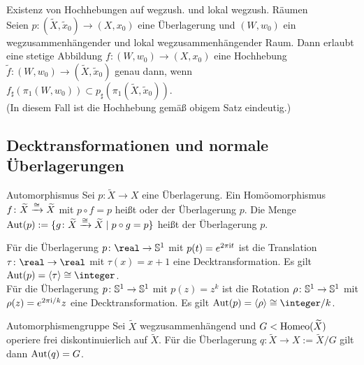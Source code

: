 \begin{Satz}{Existenz von Hochhebungen auf wegzush.
             und lokal wegzush. Räumen}\\
    Seien $p\colon (\widetilde{X}, \widetilde{x}_0) \rightarrow (X, x_0)$
    eine Überlagerung und $(W, w_0)$ ein wegzusammenhängender und lokal
    wegzusammenhängender Raum.
    Dann erlaubt eine stetige Abbildung $f\colon (W, w_0) \rightarrow (X, x_0)$
    eine Hochhebung $\widetilde{f}\colon (W, w_0) \rightarrow
    (\widetilde{X}, \widetilde{x}_0)$ genau dann, wenn
    $f_\sharp(\pi_1(W, w_0)) \subset
    p_\sharp(\pi_1(\widetilde{X}, \widetilde{x}_0))$. \\
    (In diesem Fall ist die Hochhebung gemäß obigem Satz eindeutig.)
\end{Satz}

\subsection{%
    Decktransformationen und normale Überlagerungen%
}

\begin{Def}{Automorphismus}
    Sei $p\colon \widetilde{X} \rightarrow X$ eine Überlagerung.
    Ein Homöomorphismus $f\colon \widetilde{X} \xrightarrow{\cong} \widetilde{X}$ mit
    $p \circ f = p$ heißt  oder
     der Überlagerung $p$.
    Die Menge $\text{Aut}(p) := \{g\colon \widetilde{X} \xrightarrow{\cong} \widetilde{X} \;|\;
    p \circ g = p\}$ heißt  der Überlagerung $p$.
\end{Def}

\begin{Bsp}
    Für die Überlagerung $p\colon \real \rightarrow \sphere^1$ mit
    $p(t) = e^{2\pi\mathrm{i} t}$ ist die Translation
    $\tau\colon \real \rightarrow \real$ mit
    $\tau(x) = x + 1$ eine Decktransformation.
    Es gilt $\Aut(p) = \aufspann{\tau} \cong \integer$. \\
    Für die Überlagerung $p\colon \mathbb{S}^1 \rightarrow \mathbb{S}^1$ mit
    $p(z) = z^k$ ist die Rotation
    $\rho\colon \mathbb{S}^1 \rightarrow \mathbb{S}^1$ mit
    $\rho(z) = e^{2\pi\mathrm{i}/k} z$ eine Decktransformation.
    Es gilt $\Aut(p) = \aufspann{\rho} \cong \integer/k$.
\end{Bsp}

\begin{Satz}{Automorphismengruppe}
    Sei $\widetilde{X}$ wegzusammenhängend und $G < \text{Homeo}(\widetilde{X})$
    operiere frei diskontinuierlich auf $\widetilde{X}$.
    Für die Überlagerung
    $q\colon \widetilde{X} \rightarrow X := \widetilde{X}/G$ gilt dann
    $\text{Aut}(q) = G$.
\end{Satz}

